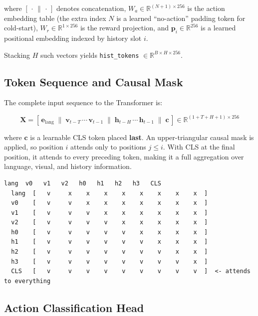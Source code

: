 \documentclass[12pt, a4paper]{article}
\begin{document}
where $[\,\cdot\,\|\,\cdot\,]$ denotes concatenation,
$W_a \in \mathbb{R}^{(N+1)\times256}$ is the action embedding table
(the extra index $N$ is a learned ``no-action'' padding token for
cold-start),
$W_r \in \mathbb{R}^{1\times256}$ is the reward projection,
and $\mathbf{p}_i \in \mathbb{R}^{256}$ is a learned positional embedding
indexed by history slot $i$.

Stacking $H$ such vectors yields \texttt{hist\_tokens} $\in \mathbb{R}^{B \times H \times 256}$.

\subsection{Token Sequence and Causal Mask}

The complete input sequence to the Transformer is:

\[
  \mathbf{X} = [\,\mathbf{e}_\text{lang} \;\|\;
                   \mathbf{v}_{t-T}\,\cdots\,\mathbf{v}_{t-1} \;\|\;
                   \mathbf{h}_{t-H}\,\cdots\,\mathbf{h}_{t-1} \;\|\;
                   \mathbf{c}\,]
              \in \mathbb{R}^{(1+T+H+1) \times 256}
\]

where $\mathbf{c}$ is a learnable CLS token placed \textbf{last}.
An upper-triangular causal mask is applied, so position $i$ attends only to
positions $j \leq i$.
With CLS at the final position, it attends to every preceding token, making
it a full aggregation over language, visual, and history information.

\begin{lstlisting}[style=Diagram, caption={Causal attention mask for default config (T=3, H=4). Tick = attend, X = blocked.}]
           lang  v0   v1   v2   h0   h1   h2   h3   CLS
  lang  [   v     x    x    x    x    x    x    x    x  ]
  v0    [   v     v    x    x    x    x    x    x    x  ]
  v1    [   v     v    v    x    x    x    x    x    x  ]
  v2    [   v     v    v    v    x    x    x    x    x  ]
  h0    [   v     v    v    v    v    x    x    x    x  ]
  h1    [   v     v    v    v    v    v    x    x    x  ]
  h2    [   v     v    v    v    v    v    v    x    x  ]
  h3    [   v     v    v    v    v    v    v    v    x  ]
  CLS   [   v     v    v    v    v    v    v    v    v  ]  <- attends to everything
\end{lstlisting}

\subsection{Action Classification Head}
\end{document}
